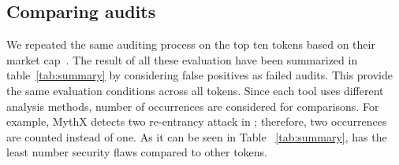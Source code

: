 
\subsection{Comparing audits}
We repeated the same auditing process on the top ten tokens based on their market cap~\cite{EtherScan}. The result of all these evaluation have been summarized in table~\ref{tab:summary} by considering false positives as failed audits. This provide the same evaluation conditions across all tokens. Since each tool uses different analysis methods, number of occurrences are considered for comparisons. For example, MythX detects two re-entrancy attack in \sys; therefore, two occurrences are counted instead of one. As it can be seen in Table ~\ref{tab:summary}, \sys has the least number security flaws compared to other tokens.


